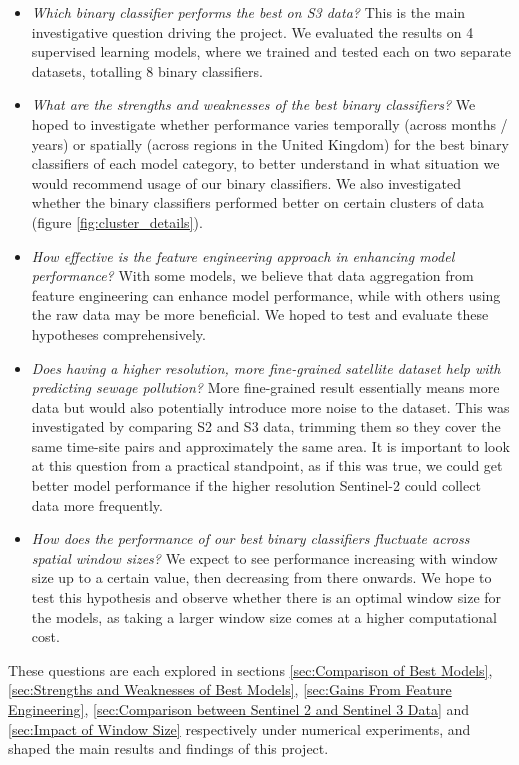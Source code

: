 \documentclass[a4paper,11pt]{report}
\begin{document}
\begin{itemize}
    \item \textit{Which binary classifier performs the best on S3 data?} This is the main investigative question driving the project. We evaluated the results on 4 supervised learning models, where we trained and tested each on two separate datasets, totalling 8 binary classifiers. 
    \item \textit{What are the strengths and weaknesses of the best binary classifiers?} We hoped to investigate whether performance varies temporally (across months / years) or spatially (across regions in the United Kingdom) for the best binary classifiers of each model category, to better understand in what situation we would recommend usage of our binary classifiers. We also investigated whether the binary classifiers performed better on certain clusters of data (figure \ref{fig:cluster_details}). 
    \item \textit{How effective is the feature engineering approach in enhancing model performance?} With some models, we believe that data aggregation from feature engineering can enhance model performance, while with others using the raw data may be more beneficial. We hoped to test and evaluate these hypotheses comprehensively. 
    \item \textit{Does having a higher resolution, more fine-grained satellite dataset help with predicting sewage pollution?} More fine-grained result essentially means more data but would also potentially introduce more noise to the dataset. This was investigated by comparing S2 and S3 data, trimming them so they cover the same time-site pairs and approximately the same area. It is important to look at this question from a practical standpoint, as if this was true, we could get better model performance if the higher resolution Sentinel-2 could collect data more frequently.  
    \item \textit{How does the performance of our best binary classifiers fluctuate across spatial window sizes?} We expect to see performance increasing with window size up to a certain value, then decreasing from there onwards. We hope to test this hypothesis and observe whether there is an optimal window size for the models, as taking a larger window size comes at a higher computational cost. 
\end{itemize} 

These questions are each explored in sections \ref{sec:Comparison of Best Models}, \ref{sec:Strengths and Weaknesses of Best Models}, \ref{sec:Gains From Feature Engineering}, \ref{sec:Comparison between Sentinel 2 and Sentinel 3 Data} and \ref{sec:Impact of Window Size} respectively under numerical experiments, and shaped the main results and findings of this project. \\
\end{document}
